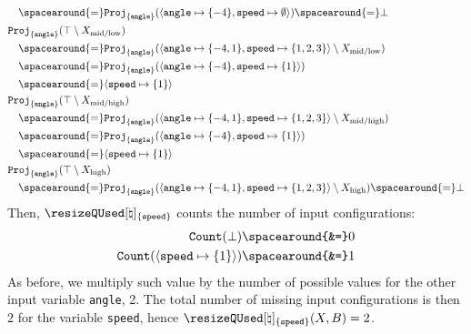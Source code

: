 \begin{example}
\begin{align*}
    &\quad\spacearound{=} \abstractdomainproject[{\{\texttt{angle}\}}](\langle \texttt{angle} \mapsto \{-4\}, \texttt{speed} \mapsto \emptyset\rangle) \spacearound{=}\abstractdomainbottom \\
    &\abstractdomainproject[{\{\texttt{angle}\}}](\abstractdomaintop \setminus \prefrombucket[\textup{mid\-/low}]) \\
    &\quad\spacearound{=} \abstractdomainproject[{\{\texttt{angle}\}}](\langle \texttt{angle} \mapsto \{-4, 1\}, \texttt{speed} \mapsto \{1, 2, 3\} \rangle \setminus \prefrombucket[\textup{mid\-/low}]) \\
    &\quad\spacearound{=} \abstractdomainproject[{\{\texttt{angle}\}}](\langle \texttt{angle} \mapsto \{-4\}, \texttt{speed} \mapsto \{1\}\rangle) \\
    &\quad\spacearound{=} \langle \texttt{speed} \mapsto \{1\} \rangle \\
    &\abstractdomainproject[{\{\texttt{angle}\}}](\abstractdomaintop \setminus \prefrombucket[\textup{mid\-/high}]) \\
    &\quad\spacearound{=} \abstractdomainproject[{\{\texttt{angle}\}}](\langle \texttt{angle} \mapsto \{-4, 1\}, \texttt{speed} \mapsto \{1, 2, 3\} \rangle \setminus \prefrombucket[\textup{mid\-/high}]) \\
    &\quad\spacearound{=} \abstractdomainproject[{\{\texttt{angle}\}}](\langle \texttt{angle} \mapsto \{-4\}, \texttt{speed} \mapsto \{1\}\rangle) \\
    &\quad\spacearound{=} \langle \texttt{speed} \mapsto \{1\} \rangle \\
    &\abstractdomainproject[{\{\texttt{angle}\}}](\abstractdomaintop \setminus \prefrombucket[\textup{high}]) \\
    &\quad\spacearound{=} \abstractdomainproject[{\{\texttt{angle}\}}](\langle \texttt{angle} \mapsto \{-4, 1\}, \texttt{speed} \mapsto \{1, 2, 3\} \rangle \setminus \prefrombucket[\textup{high}]) \spacearound{=} \abstractdomainbottom
  \end{align*}
  Then, $\abstractqusedname_{\{\texttt{speed}\}}$ counts the number of input configurations:
  \begin{align*}
    \abstractdomaincount(\abstractdomainbottom) \spacearound{&=} 0 \\
    \abstractdomaincount(\langle \texttt{speed} \mapsto \{1\} \rangle) \spacearound{&=} 1 \\
  \end{align*}
  As before, we multiply such value by the number of possible values for the other input variable \texttt{angle}, \cf{} 2.
  The total number of missing input configurations is then $2$ for the variable \texttt{speed}, hence $\abstractqusedname_{\{\texttt{speed}\}}(\presfrombuckets, \buckets) = 2$.
\end{example}

